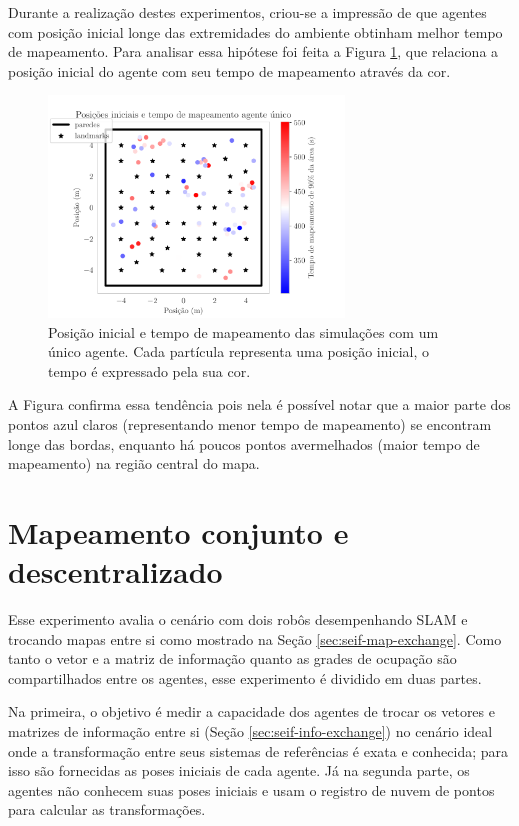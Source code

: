 Durante a realização destes experimentos, criou-se a impressão de que agentes com posição inicial longe das extremidades do ambiente obtinham 
melhor tempo de mapeamento. Para analisar essa hipótese foi feita a Figura \ref{fig:single-agent-initial-pos-and-time}, que relaciona a 
posição inicial do agente com seu tempo de mapeamento através da cor. 

\begin{figure}
  \centering
  \includegraphics[width=0.7\textwidth]{figs/single-agent/initial_positions_and_time_single_agent.pdf}
  \caption[Posição inicial e tempo de mapeamento das simulações com um único agente.]{Posição inicial e tempo de mapeamento das simulações com um único agente. Cada partícula representa uma posição inicial, o tempo é expressado pela sua cor.}
  \label{fig:single-agent-initial-pos-and-time}
\end{figure}
A Figura confirma essa tendência pois nela é possível notar que a maior parte dos pontos azul claros (representando menor tempo de mapeamento) se 
encontram longe das bordas, enquanto há poucos pontos avermelhados (maior tempo de mapeamento) na região central do mapa.

\section{Mapeamento conjunto e descentralizado}
Esse experimento avalia o cenário com dois robôs desempenhando SLAM 
e trocando mapas entre si como mostrado na Seção \ref{sec:seif-map-exchange}. Como tanto o vetor e a matriz de informação 
quanto as grades de ocupação são compartilhados entre os agentes, esse 
experimento é dividido em duas partes.

Na primeira, o objetivo é medir a 
capacidade dos agentes de trocar os vetores e matrizes de informação 
entre si (Seção \ref{sec:seif-info-exchange}) no cenário ideal onde a
transformação entre seus sistemas de referências é exata e conhecida; para isso são fornecidas as poses iniciais de cada agente. Já 
na segunda parte, os agentes não conhecem suas poses iniciais e usam o 
registro de nuvem de pontos para calcular as transformações.

